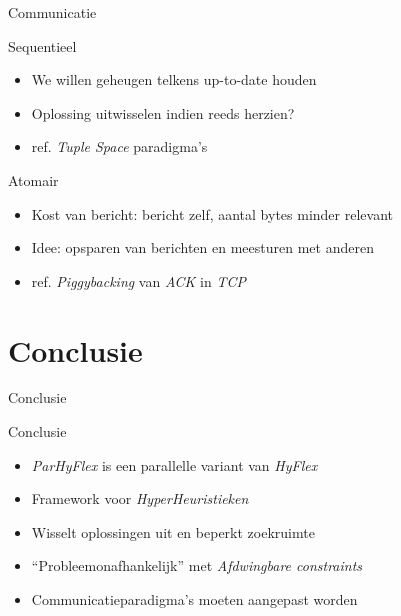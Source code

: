 \documentclass[handout]{beamer}
\begin{document}
\begin{frame}{Communicatie}
\begin{block}{Sequentieel}
\begin{itemize}[<+->]
 \item We willen geheugen telkens up-to-date houden
 \item Oplossing uitwisselen indien reeds herzien?
 \item ref. \emph{Tuple Space} paradigma's
\end{itemize}
\end{block}
\begin{block}{Atomair}
\begin{itemize}[<+->]
 \item Kost van bericht: bericht zelf, aantal bytes minder relevant
 \item Idee: opsparen van berichten en meesturen met anderen
 \item ref. \emph{Piggybacking} van \emph{ACK} in \emph{TCP}
\end{itemize}
\end{block}
\end{frame}
\section{Conclusie}
\begin{frame}{Conclusie}
\begin{block}{Conclusie}
\begin{itemize}[<+->]
 \item \emph{ParHyFlex} is een parallelle variant van \emph{HyFlex}
 \item Framework voor \emph{HyperHeuristieken}
 \item Wisselt oplossingen uit en beperkt zoekruimte
 \item ``Probleemonafhankelijk'' met \emph{Afdwingbare constraints}
 \item Communicatieparadigma's moeten aangepast worden
\end{itemize}
\end{block}
\end{frame}
\end{document}
